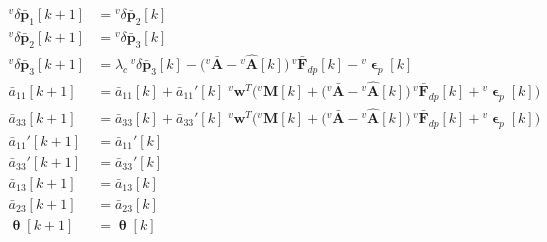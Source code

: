 \documentclass[11pt,a4paper]{ctexart}
\newcommand{\lc}{\lambda_c}
\newcommand{\dl}{\delta}
\newcommand{\bth}{\bm{\uptheta}}
\newcommand{\ww}{\mathbf w}
\newcommand{\apar}{\bar a_{11}}
\newcommand{\aper}{\bar a_{33}}
\newcommand{\T}{T}
\newcommand{\vA}{{}^{v}\bar{\mathbf A}}
\newcommand{\vAh}{{}^{v}\hat{\mathbf A}}
\newcommand{\vdp}{{}^{v}\dl\bar{\mathbf p}}
\newcommand{\vF}{{}^{v}\bar{\mathbf F}_{dp}}
\newcommand{\vM}{{}^{v}\mathbf M}
\newcommand{\vep}{{}^{v}\bm{\upvarepsilon}_p}
\begin{document}
\begin{align*}
\vdp_1[k+1] &= \vdp_2[k] \\
\vdp_2[k+1] &= \vdp_3[k] \\
\vdp_3[k+1] &= \lc\,\vdp_3[k] - \big(\vA - \vAh[k]\big)\,\vF[k] - \vep[k] \\
\apar[k+1] &= \apar[k] + \apar'[k]\;{}^{v}\ww^{\T}\Big(\vM[k] + \big(\vA - \vAh[k]\big)\,\vF[k] + \vep[k]\Big) \\
\aper[k+1] &= \aper[k] + \aper'[k]\;{}^{v}\ww^{\T}\Big(\vM[k] + \big(\vA - \vAh[k]\big)\,\vF[k] + \vep[k]\Big) \\
\apar'[k+1] &= \apar'[k] \\
\aper'[k+1] &= \aper'[k] \\
\bar a_{13}[k+1] &= \bar a_{13}[k] \\
\bar a_{23}[k+1] &= \bar a_{23}[k] \\
\bth[k+1] &= \bth[k]
\end{align*}

\clearpage
\end{document}
